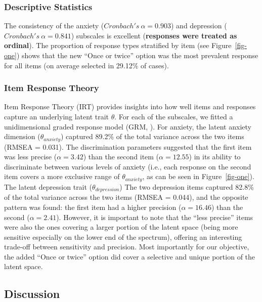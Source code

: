 \documentclass[
  jou,
  longtable,
  nolmodern,
  notxfonts,
  notimes,
  mask,
  colorlinks=true,linkcolor=blue,citecolor=blue,urlcolor=blue]{apa7}
\begin{document}
\subsubsection{Descriptive Statistics}\label{descriptive-statistics}

The consistency of the anxiety (\(Cronbach's~\alpha = 0.903\)) and
depression (\(Cronbach's~\alpha = 0.841\)) subscales is excellent
(\textbf{responses were treated as ordinal}). The proportion of response
types stratified by item (see Figure~\ref{fig-one}) shows that the new
``Once or twice'' option was the most prevalent response for all items
(on average selected in 29.12\% of cases).

\subsubsection{Item Response Theory}\label{item-response-theory}

Item Response Theory (IRT) provides insights into how well items and
responses capture an underlying latent trait \(\theta\). For each of the
subscales, we fitted a unidimensional graded response model (GRM,
). For anxiety, the
latent anxiety dimension (\(\theta_{anxiety}\)) captured 89.2\% of the
total variance across the two items (RMSEA = 0.031). The discrimination
parameters suggested that the first item was less precise
(\(\alpha = 3.42\)) than the second item (\(\alpha = 12.55\)) in its
ability to discriminate between various levels of anxiety (i.e., each
response on the second item covers a more exclusive range of
\(\theta_{anxiety}\), as can be seen in Figure~\ref{fig-one}). The
latent depression trait (\(\theta_{depression}\)) The two depression
items captured 82.8\% of the total variance across the two items (RMSEA
= 0.044), and the opposite pattern was found: the first item had a
higher precision (\(\alpha = 16.46\)) than the second
(\(\alpha = 2.41\)). However, it is important to note that the ``less
precise'' items were also the ones covering a larger portion of the
latent space (being more sensitive especially on the lower end of the
spectrum), offering an interesting trade-off between sensitivity and
precision. Most importantly for our objective, the added ``Once or
twice'' option did cover a selective and unique portion of the latent
space.

\subsection{Discussion}\label{discussion}
\end{document}
